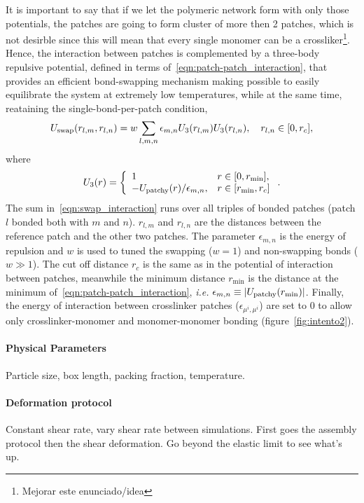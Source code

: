 It is important to say that if we let the polymeric network form with only those potentials, the patches are going to form cluster of more then 2 patches, which is not desirble since this will mean that every single monomer can be a crossliker\footnote{Mejorar este enunciado/idea}.
Hence, the interaction between patches is complemented by a three-body repulsive potential, defined in terms of~\eqref{eqn:patch-patch_interaction}, that provides an efficient bond-swapping mechanism making possible to easily equilibrate the system at extremely low temperatures, while at the same time, reataining the single-bond-per-patch condition\citep{sciortinoThreebodyPotentialSimulating2017},
\begin{gather}
    U_{\mathrm{swap}}(r_{l,m},r_{l,n}) = w\sum_{l,m,n}\epsilon_{m,n}U_3\qty(r_{l,m})U_3\qty(r_{l,n}),\quad r_{l,n}\in\qty[0,r_c],\label{eqn:swap_interaction}
\end{gather}
where
\begin{gather}
    U_{3}\qty(r) = \left\{
        \begin{array}{ll}
            1 & r\in\qty[0,r_{\min}], \\
            -U_{\mathrm{patchy}}\qty(r)/\epsilon_{m,n}, & r\in\qty[r_{\min},r_c]
        \end{array}
        \right.\label{eqn:swapmod_interaction}.
\end{gather}
The sum in~\eqref{eqn:swap_interaction} runs over all triples of bonded patches (patch $l$ bonded both with $m$ and $n$).
$r_{l,m}$ and $r_{l,n}$ are the distances between the reference patch and the other two patches.
The parameter $\epsilon_{m,n}$ is the energy of repulsion and $w$ is used to tuned the swapping ($w=1$) and non-swapping bonds ($w\gg1$). 
The cut off distance $r_c$ is the same as in the potential of interaction between patches, meanwhile the minimum distance $r_{\min}$ is the distance at the minimum of~\eqref{eqn:patch-patch_interaction}, \textit{i.e.} $\epsilon_{m,n}\equiv\abs{U_{\mathrm{patchy}}(r_{\min})}$.
Finally, the energy of interaction between crosslinker patches ($\epsilon_{\mu^i,\mu^i}$) are set to $0$ to allow only crosslinker-monomer and monomer-monomer bonding (figure~\ref{fig:intento2}).


\paragraph{Physical Parameters} Particle size, box length, packing fraction, temperature.

\paragraph{Deformation protocol} Constant shear rate, vary shear rate between simulations.
First goes the assembly protocol then the shear deformation.
Go beyond the elastic limit to see what's up.

